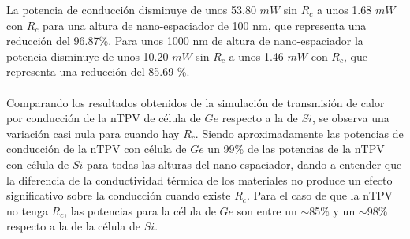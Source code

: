 La potencia de conducción disminuye de unos 53.80 $mW$ sin $R_c$ a unos 1.68 $mW$ con $R_c$ para una altura de nano-espaciador de 100 nm, que representa una reducción del 96.87\%. Para unos 1000 nm de altura de nano-espaciador la potencia disminuye de unos 10.20 $mW$ sin $R_c$ a unos 1.46 $mW$ con $R_c$, que representa una reducción del 85.69 \%.\\\\
Comparando los resultados obtenidos de la simulación de transmisión de calor por conducción de la nTPV de célula de $Ge$ respecto a la de $Si$, se observa una variación casi nula para cuando hay $R_c$. Siendo aproximadamente las potencias de conducción de la nTPV con célula de $Ge$ un 99\% de las potencias de la nTPV con célula de $Si$ para todas las alturas del nano-espaciador, dando a entender que la diferencia de la conductividad térmica de los materiales no produce un efecto significativo sobre la conducción cuando existe $R_c$. Para el caso de que la nTPV no tenga $R_c$, las potencias para la célula de $Ge$ son entre un $\sim$85\% y un $\sim$98\% respecto a la de la célula de $Si$.
\vfill
